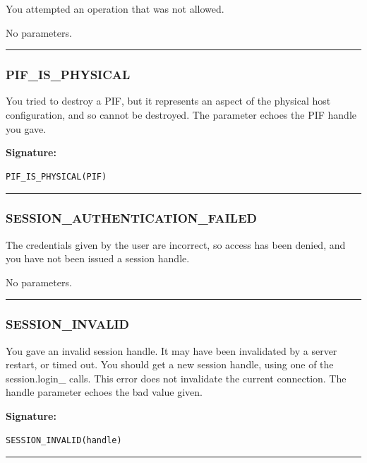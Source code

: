 You attempted an operation that was not allowed.

\vspace{0.3cm}
No parameters.
\begin{center}\rule{10em}{0.1pt}\end{center}

\subsubsection{PIF\_IS\_PHYSICAL}

You tried to destroy a PIF, but it represents an aspect of the physical
host configuration, and so cannot be destroyed.  The parameter echoes the
PIF handle you gave.

\vspace{0.3cm}
{\bf Signature:}
\begin{verbatim}PIF_IS_PHYSICAL(PIF)\end{verbatim}
\begin{center}\rule{10em}{0.1pt}\end{center}

\subsubsection{SESSION\_AUTHENTICATION\_FAILED}

The credentials given by the user are incorrect, so access has been denied,
and you have not been issued a session handle.

\vspace{0.3cm}
No parameters.
\begin{center}\rule{10em}{0.1pt}\end{center}

\subsubsection{SESSION\_INVALID}

You gave an invalid session handle.  It may have been invalidated by a
server restart, or timed out.  You should get a new session handle, using
one of the session.login\_ calls.  This error does not invalidate the
current connection.  The handle parameter echoes the bad value given.

\vspace{0.3cm}
{\bf Signature:}
\begin{verbatim}SESSION_INVALID(handle)\end{verbatim}
\begin{center}\rule{10em}{0.1pt}\end{center}

